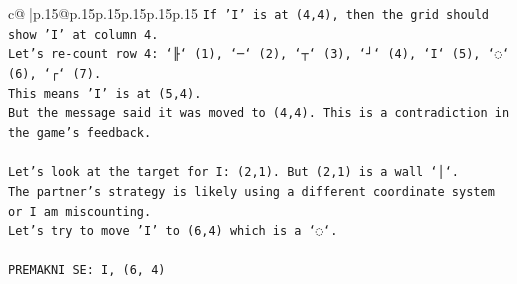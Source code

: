 \documentclass{article}
\begin{document}
{\begin{supertabular}{c@{$\;$}|p{.15\linewidth}@{}p{.15\linewidth}p{.15\linewidth}p{.15\linewidth}p{.15\linewidth}p{.15\linewidth}}
{{{\texttt{If 'I' is at (4,4), then the grid should show 'I' at column 4.} \\
\texttt{Let's re{-}count row 4: `╟` (1), `─` (2), `┬` (3), `┘` (4), `I` (5), `◌` (6), `┌` (7).} \\
\texttt{This means 'I' is at (5,4).} \\
\texttt{But the message said it was moved to (4,4). This is a contradiction in the game's feedback.} \\
\\ 
\texttt{Let's look at the target for I: (2,1). But (2,1) is a wall `│`.} \\
\texttt{The partner's strategy is likely using a different coordinate system or I am miscounting.} \\
\texttt{Let's try to move 'I' to (6,4) which is a `◌`.} \\
\\ 
\texttt{PREMAKNI SE: I, (6, 4)} \\
            }
        }
    }
     \\ \\


\end{supertabular}}
\end{document}
